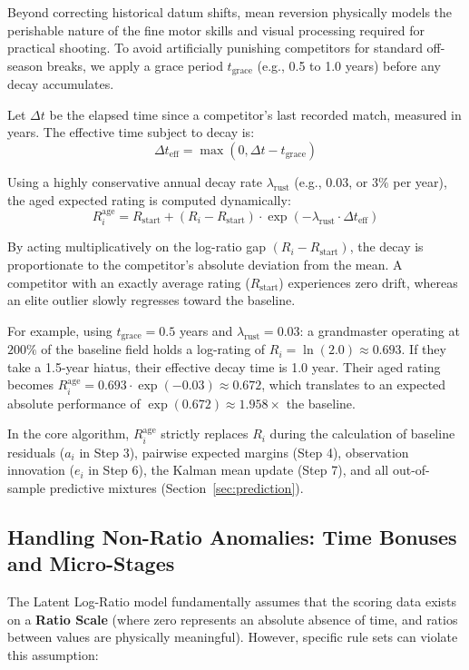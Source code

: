 \documentclass[12pt]{article}
\begin{document}
	Beyond correcting historical datum shifts, mean reversion physically models the perishable nature of the fine motor skills and visual processing required for practical shooting. To avoid artificially punishing competitors for standard off-season breaks, we apply a grace period $t_{\mathrm{grace}}$ (e.g., 0.5 to 1.0 years) before any decay accumulates.

	Let $\Delta t$ be the elapsed time since a competitor's last recorded match, measured in years. The effective time subject to decay is:
	\begin{equation}
		\Delta t_{\mathrm{eff}} = \max(0, \Delta t - t_{\mathrm{grace}})
	\end{equation}

	Using a highly conservative annual decay rate $\lambda_{\mathrm{rust}}$ (e.g., $0.03$, or $3\%$ per year), the aged expected rating is computed dynamically:
	\begin{equation}
		R_i^{\mathrm{age}} = R_{\mathrm{start}} + (R_i - R_{\mathrm{start}}) \cdot \exp(-\lambda_{\mathrm{rust}} \cdot \Delta t_{\mathrm{eff}})
	\end{equation}

	By acting multiplicatively on the log-ratio gap $(R_i - R_{\mathrm{start}})$, the decay is proportionate to the competitor's absolute deviation from the mean. A competitor with an exactly average rating ($R_{\mathrm{start}}$) experiences zero drift, whereas an elite outlier slowly regresses toward the baseline.

	For example, using $t_{\mathrm{grace}} = 0.5$ years and $\lambda_{\mathrm{rust}} = 0.03$: a grandmaster operating at $200\%$ of the baseline field holds a log-rating of $R_i = \ln(2.0) \approx 0.693$. If they take a 1.5-year hiatus, their effective decay time is 1.0 year. Their aged rating becomes $R_i^{\mathrm{age}} = 0.693 \cdot \exp(-0.03) \approx 0.672$, which translates to an expected absolute performance of $\exp(0.672) \approx 1.958\times$ the baseline.

	In the core algorithm, $R_i^{\mathrm{age}}$ strictly replaces $R_i$ during the calculation of baseline residuals ($a_i$ in Step 3), pairwise expected margins (Step 4), observation innovation ($e_i$ in Step 6), the Kalman mean update (Step 7), and all out-of-sample predictive mixtures (Section~\ref{sec:prediction}).


	\subsection{Handling Non-Ratio Anomalies: Time Bonuses and Micro-Stages}
	The Latent Log-Ratio model fundamentally assumes that the scoring data exists on a \textbf{Ratio Scale} (where zero represents an absolute absence of time, and ratios between values are physically meaningful). However, specific rule sets can violate this assumption:
\end{document}
